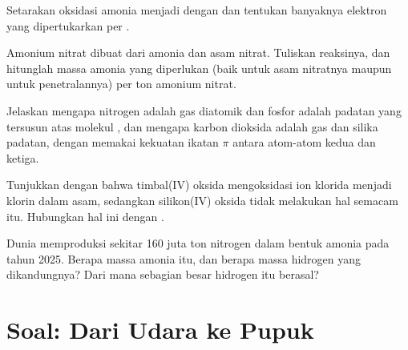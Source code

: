 \begin{exercise}[$\star\star$]\label{exo:b1:p-block-13-15:8}
Setarakan oksidasi amonia menjadi  dengan  dan
tentukan banyaknya elektron yang dipertukarkan per .
\end{exercise}

\begin{exercise}[$\star\star$]\label{exo:b1:p-block-13-15:9}
Amonium nitrat dibuat dari amonia dan asam nitrat. Tuliskan reaksinya, dan
hitunglah massa amonia yang diperlukan (baik untuk asam nitratnya maupun
untuk penetralannya) per ton amonium nitrat.
\end{exercise}

\begin{exercise}[$\star\star\star$]\label{exo:b1:p-block-13-15:10}
Jelaskan mengapa nitrogen adalah gas diatomik dan fosfor adalah padatan
yang tersusun atas molekul , dan mengapa karbon dioksida adalah
gas dan silika padatan, dengan memakai kekuatan ikatan $\pi$ antara
atom-atom  kedua dan  ketiga.
\end{exercise}

\begin{exercise}[$\star\star\star$]\label{exo:b1:p-block-13-15:11}
Tunjukkan dengan  bahwa timbal(IV) oksida mengoksidasi
ion klorida menjadi klorin dalam asam, sedangkan silikon(IV) oksida tidak
melakukan hal semacam itu. Hubungkan hal ini dengan .
\end{exercise}

\begin{exercise}[$\star\star\star$]\label{exo:b1:p-block-13-15:12}
Dunia memproduksi sekitar 160 juta ton nitrogen dalam bentuk amonia pada
tahun 2025. Berapa massa amonia itu, dan berapa massa hidrogen yang
dikandungnya? Dari mana sebagian besar hidrogen itu berasal?
\end{exercise}

\section{Soal: Dari Udara ke Pupuk}

